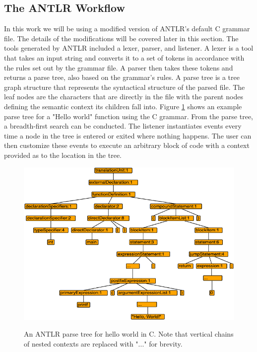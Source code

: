 \subsection{The ANTLR Workflow}
\label{subsec:antlr_workflow}

In this work we will be using a modified version of ANTLR's default C grammar file. The details of the modifications will be covered later in this section. The tools generated by ANTLR included a lexer, parser, and listener. A lexer is a tool that takes an input string and converts it to a set of tokens in accordance with the rules set out by the grammar file. A parser then takes these tokens and returns a parse tree, also based on the grammar's rules. A parse tree is a tree graph structure that represents the syntactical structure of the parsed file. The leaf nodes are the characters that are directly in the file with the parent nodes defining the semantic context its children fall into. Figure \ref{fig:hello_world} shows an example parse tree for a "Hello world" function using the C grammar. From the parse tree, a breadth-first search can be conducted. The listener instantiates events every time a node in the tree is entered or exited where nothing happens. The user can then customize these events to execute an arbitrary block of code with a context provided as to the location in the tree.

\begin{figure}[ht]
    \centering
    \includegraphics[width=1.0\linewidth]{figures/antlr_hello_world.png} \\
    \caption{An ANTLR parse tree for hello world in C. Note that vertical chains of nested contexts are replaced with "..." for brevity.}
    \label{fig:hello_world}
\end{figure}

